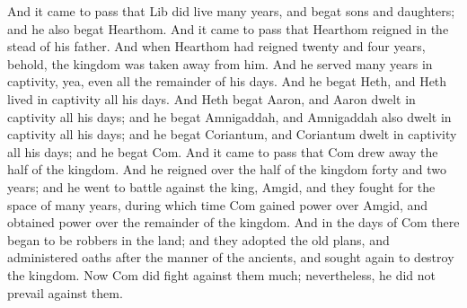 And it came to pass that Lib did live many years, and begat sons and daughters; and he also begat Hearthom.
\bverse \iffalse And it came to pass that Hearthom reigned in the stead of his father. And when Hearthom had reigned twenty and four years, behold, the kingdom was taken away from him. And he served many years in captivity, yea, even all the remainder of his days. \fi
And it came to pass that Hearthom reigned in the stead of his father. And when Hearthom had reigned twenty and four years, behold, the kingdom was taken away from him. And he served many years in captivity, yea, even all the remainder of his days.
\bverse \iffalse And he begat Heth, and Heth lived in captivity all his days.  And Heth begat Aaron, and Aaron dwelt in captivity all his days; and he begat Amnigaddah, and Amnigaddah also dwelt in captivity all his days; and he begat Coriantum, and Coriantum dwelt in captivity all his days; and he begat Com. \fi
And he begat Heth, and Heth lived in captivity all his days.  And Heth begat Aaron, and Aaron dwelt in captivity all his days; and he begat Amnigaddah, and Amnigaddah also dwelt in captivity all his days; and he begat Coriantum, and Coriantum dwelt in captivity all his days; and he begat Com.
\bverse \iffalse And it came to pass that Com drew away the half of the kingdom. And he reigned over the half of the kingdom forty and two years; and he went to battle against the king, Amgid, and they fought for the space of many years, during which time Com gained power over Amgid, and obtained power over the remainder of the kingdom. \fi
And it came to pass that Com drew away the half of the kingdom. And he reigned over the half of the kingdom forty and two years; and he went to battle against the king, Amgid, and they fought for the space of many years, during which time Com gained power over Amgid, and obtained power over the remainder of the kingdom.
\bverse \iffalse And in the days of Com there began to be robbers in the land; and they adopted the old plans, and administered oaths after the manner of the ancients, and sought again to destroy the kingdom. \fi
And in the days of Com there began to be robbers in the land; and they adopted the old plans, and administered oaths after the manner of the ancients, and sought again to destroy the kingdom.
\bverse \iffalse Now Com did fight against them much; nevertheless, he did not prevail against them. \fi
Now Com did fight against them much; nevertheless, he did not prevail against them.

